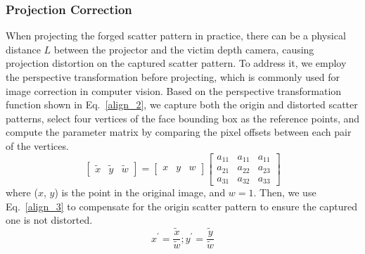 \subsubsection{Projection Correction}
When projecting the forged scatter pattern in practice, there can be a physical distance $L$ between the projector and the victim depth camera, causing projection distortion on the captured scatter pattern. To address it, we employ the perspective transformation before projecting, which is commonly used for image correction in computer vision. Based on the perspective transformation function shown in Eq.~\ref{align_2}, we capture both the origin and distorted scatter patterns, select four vertices of the face bounding box as the reference points, and compute the parameter matrix by comparing the pixel offsets between each pair of the vertices.
\begin{equation}
	\begin{bmatrix} \tilde{x} & \tilde{y} & \tilde{w}\end{bmatrix} = \begin{bmatrix} x&y&w\end{bmatrix}
	\begin{bmatrix} 
		a_{11}&a_{11}&a_{11} \\
		a_{21}&a_{22}&a_{23} \\
		a_{31}&a_{32}&a_{33} 
	\end{bmatrix}
	\label{align_2}
\end{equation}
where ($x$, $y$) is the point in the original image, and $w = 1$. 
Then, we use Eq.~\ref{align_3} to compensate for the origin scatter pattern to ensure the captured one is not distorted.
\begin{equation}
	x^{'} = \frac{\tilde{x}}{\tilde{w}};
	y^{'} = \frac{\tilde{y}}{\tilde{w}}
	\label{align_3}
\end{equation}

%


